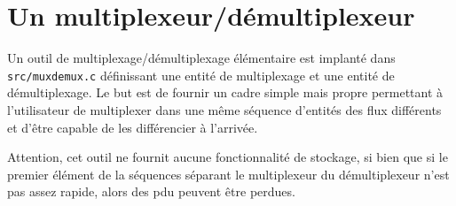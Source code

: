 %
\section{Un multiplexeur/démultiplexeur}
\label{section:muxdemux}

   Un outil de multiplexage/démultiplexage élémentaire est implanté
dans {\tt src/muxdemux.c} définissant une entité de multiplexage et
une entité de démultiplexage. Le but est de fournir un cadre simple
mais propre permettant à l'utilisateur de multiplexer dans une même
séquence d'entités des flux différents et d'\^etre capable de les
différencier à l'arrivée.

   Attention, cet outil ne fournit aucune fonctionnalité de stockage,
si bien que si le premier élément de la séquences séparant le
multiplexeur du démultiplexeur n'est pas assez rapide, alors des {\sc
  pdu} peuvent être perdues.
